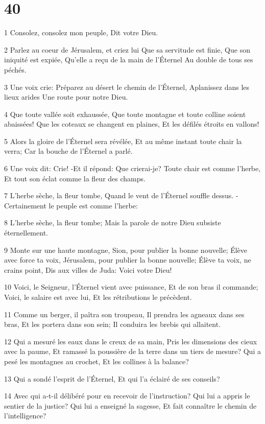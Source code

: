 \chapter{40}

\par 1 Consolez, consolez mon peuple, Dit votre Dieu.
\par 2 Parlez au coeur de Jérusalem, et criez lui Que sa servitude est finie, Que son iniquité est expiée, Qu'elle a reçu de la main de l'Éternel Au double de tous ses péchés.
\par 3 Une voix crie: Préparez au désert le chemin de l'Éternel, Aplanissez dans les lieux arides Une route pour notre Dieu.
\par 4 Que toute vallée soit exhaussée, Que toute montagne et toute colline soient abaissées! Que les coteaux se changent en plaines, Et les défilés étroits en vallons!
\par 5 Alors la gloire de l'Éternel sera révélée, Et au même instant toute chair la verra; Car la bouche de l'Éternel a parlé.
\par 6 Une voix dit: Crie! -Et il répond: Que crierai-je? Toute chair est comme l'herbe, Et tout son éclat comme la fleur des champs.
\par 7 L'herbe sèche, la fleur tombe, Quand le vent de l'Éternel souffle dessus. -Certainement le peuple est comme l'herbe:
\par 8 L'herbe sèche, la fleur tombe; Mais la parole de notre Dieu subsiste éternellement.
\par 9 Monte sur une haute montagne, Sion, pour publier la bonne nouvelle; Élève avec force ta voix, Jérusalem, pour publier la bonne nouvelle; Élève ta voix, ne crains point, Dis aux villes de Juda: Voici votre Dieu!
\par 10 Voici, le Seigneur, l'Éternel vient avec puissance, Et de son bras il commande; Voici, le salaire est avec lui, Et les rétributions le précèdent.
\par 11 Comme un berger, il paîtra son troupeau, Il prendra les agneaux dans ses bras, Et les portera dans son sein; Il conduira les brebis qui allaitent.
\par 12 Qui a mesuré les eaux dans le creux de sa main, Pris les dimensions des cieux avec la paume, Et ramassé la poussière de la terre dans un tiers de mesure? Qui a pesé les montagnes au crochet, Et les collines à la balance?
\par 13 Qui a sondé l'esprit de l'Éternel, Et qui l'a éclairé de ses conseils?
\par 14 Avec qui a-t-il délibéré pour en recevoir de l'instruction? Qui lui a appris le sentier de la justice? Qui lui a enseigné la sagesse, Et fait connaître le chemin de l'intelligence?
